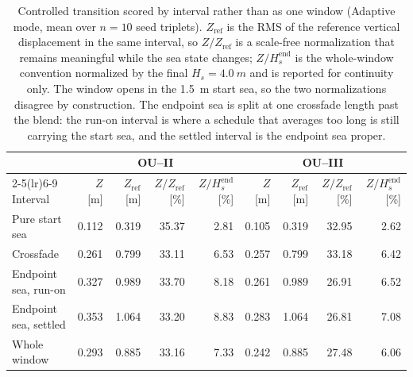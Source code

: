 \begin{table}[t]
  \centering
  \caption{Controlled transition scored by interval rather than as one window (Adaptive mode, mean over $n=10$ seed triplets). $Z_{\mathrm{ref}}$ is the RMS of the reference vertical displacement in the same interval, so $Z/Z_{\mathrm{ref}}$ is a scale-free normalization that remains meaningful while the sea state changes; $Z/H_s^{\mathrm{end}}$ is the whole-window convention normalized by the final $H_s=\SI{4.0}{m}$ and is reported for continuity only. The window opens in the \SI{1.5}{m} start sea, so the two normalizations disagree by construction. The endpoint sea is split at one crossfade length past the blend: the run-on interval is where a schedule that averages too long is still carrying the start sea, and the settled interval is the endpoint sea proper.}
  \label{tab:ou_transition_segments}
  \footnotesize
  \setlength{\tabcolsep}{3.4pt}
  \begin{tabular}{@{}lrrrrrrrr@{}}
    \toprule
    & \multicolumn{4}{c}{OU--II} & \multicolumn{4}{c}{OU--III} \\
    \cmidrule(lr){2-5}\cmidrule(lr){6-9}
    Interval & $Z$ [m] & $Z_{\mathrm{ref}}$ [m] & $Z/Z_{\mathrm{ref}}$ [\%] & $Z/H_s^{\mathrm{end}}$ [\%] & $Z$ [m] & $Z_{\mathrm{ref}}$ [m] & $Z/Z_{\mathrm{ref}}$ [\%] & $Z/H_s^{\mathrm{end}}$ [\%] \\
    \midrule
    Pure start sea & 0.112 & 0.319 & 35.37 & 2.81 & 0.105 & 0.319 & 32.95 & 2.62 \\
    Crossfade & 0.261 & 0.799 & 33.11 & 6.53 & 0.257 & 0.799 & 33.18 & 6.42 \\
    Endpoint sea, run-on & 0.327 & 0.989 & 33.70 & 8.18 & 0.261 & 0.989 & 26.91 & 6.52 \\
    Endpoint sea, settled & 0.353 & 1.064 & 33.20 & 8.83 & 0.283 & 1.064 & 26.81 & 7.08 \\
    Whole window & 0.293 & 0.885 & 33.16 & 7.33 & 0.242 & 0.885 & 27.48 & 6.06 \\
    \bottomrule
  \end{tabular}
\end{table}


